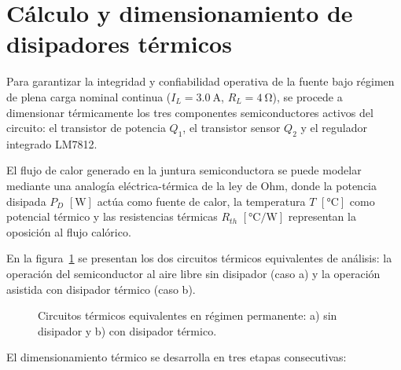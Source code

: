 \section{Cálculo y dimensionamiento de disipadores térmicos}
\label{sec.c5:disipadores}

Para garantizar la integridad y confiabilidad operativa de la fuente bajo régimen de plena carga nominal continua
($I_L = \SI{3.0}{\ampere}$, $R_L = \SI{4}{\ohm}$), se procede a dimensionar térmicamente los tres componentes
semiconductores activos del circuito: el transistor de potencia $Q_1$, el transistor sensor $Q_2$ y el regulador
integrado LM7812.

El flujo de calor generado en la juntura semiconductora se puede modelar
mediante una analogía eléctrica-térmica de la ley de Ohm,
donde la potencia disipada $P_D$ $[\si{\watt}]$ actúa como fuente de calor, la
temperatura $T$ $[\si{\celsius}]$ como potencial térmico y las resistencias
térmicas $R_{th}$ $[\si{\celsius/\watt}]$ representan la oposición al flujo
calórico.

En la figura~\ref{fig.c5:circuito_termico} se presentan los dos circuitos térmicos equivalentes de análisis: la operación
del semiconductor al aire libre sin disipador (caso a) y la operación asistida con disipador térmico (caso b).

\begin{figure}[!ht]
    \centering
    
    \caption{Circuitos térmicos equivalentes en régimen permanente: a) sin disipador y b) con disipador térmico.}
    \label{fig.c5:circuito_termico}
\end{figure}

El dimensionamiento térmico se desarrolla en tres etapas consecutivas:

